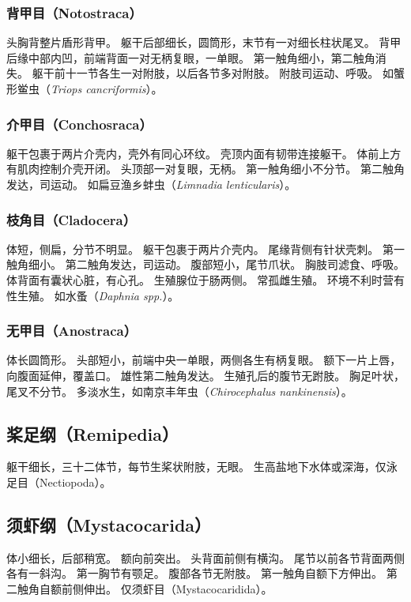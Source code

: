 \documentclass[11pt]{article}
\begin{document}
\subsubsection{背甲目（Notostraca）}
头胸背整片盾形背甲。
躯干后部细长，圆筒形，末节有一对细长柱状尾叉。
背甲后缘中部内凹，前端背面一对无柄复眼，一单眼。
第一触角细小，第二触角消失。
躯干前十一节各生一对附肢，以后各节多对附肢。
附肢司运动、呼吸。
如蟹形鲎虫（\textit{Triops cancriformis}）。

\subsubsection{介甲目（Conchosraca）}
躯干包裹于两片介壳内，壳外有同心环纹。
壳顶内面有韧带连接躯干。
体前上方有肌肉控制介壳开闭。
头顶部一对复眼，无柄。
第一触角细小不分节。
第二触角发达，司运动。
如扁豆渔乡蚌虫（\textit{Limnadia lenticularis}）。

\subsubsection{枝角目（Cladocera）}
体短，侧扁，分节不明显。
躯干包裹于两片介壳内。
尾缘背侧有针状壳刺。
第一触角细小。
第二触角发达，司运动。
腹部短小，尾节爪状。
胸肢司滤食、呼吸。
体背面有囊状心脏，有心孔。
生殖腺位于肠两侧。
常孤雌生殖。
环境不利时营有性生殖。
如水蚤（\textit{Daphnia spp.}）。

\subsubsection{无甲目（Anostraca）}
体长圆筒形。
头部短小，前端中央一单眼，两侧各生有柄复眼。
额下一片上唇，向腹面延伸，覆盖口。
雄性第二触角发达。
生殖孔后的腹节无跗肢。
胸足叶状，尾叉不分节。
多淡水生，如南京丰年虫（\textit{Chirocephalus nankinensis}）。

\subsection{桨足纲（Remipedia）}
躯干细长，三十二体节，每节生桨状附肢，无眼。
生高盐地下水体或深海，仅泳足目（Nectiopoda）。

\subsection{须虾纲（Mystacocarida）}
体小细长，后部稍宽。
额向前突出。
头背面前侧有横沟。
尾节以前各节背面两侧各有一斜沟。
第一胸节有颚足。
腹部各节无附肢。
第一触角自额下方伸出。
第二触角自额前侧伸出。
仅须虾目（Mystacocaridida）。
\end{document}
